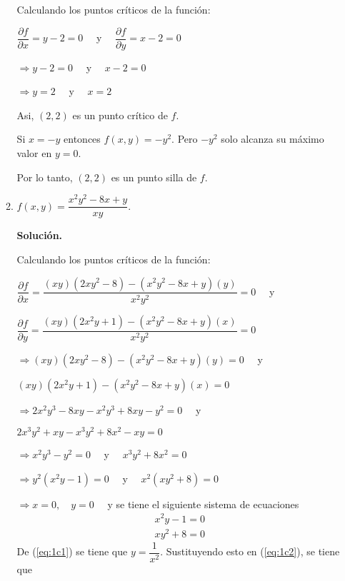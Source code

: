 \documentclass[fleqn, 12pt]{article}
\newcommand{\derivadaparcial}[2]{\dfrac{\partial {#1}}{\partial {#2}}}
\begin{document}
\begin{enumerate}
\begin{enumerate}
            Calculando los puntos críticos de la función:

            $ \derivadaparcial{f}{x} = y - 2 = 0 \quad $ y $ \quad \derivadaparcial{f}{y} = x - 2 = 0 $

            $ \Longrightarrow y - 2 = 0 \quad $ y $ \quad x - 2 = 0 $

            $ \Longrightarrow y = 2 \quad $ y $ \quad x = 2 $

            Asi, $ (2,2) $ es un punto crítico de $ f $.

            Si $ x = -y $ entonces $ f(x,y) = -y^2 $. Pero $ -y^2 $ solo alcanza su máximo valor en $ y = 0 $.

            Por lo tanto, $ (2,2) $ es un punto silla de $ f $.

            \item $ f(x,y) = \dfrac{x^2 y^2 - 8x + y}{xy} $.
            
            \textbf{Solución.}

            Calculando los puntos críticos de la función:

            $ \derivadaparcial{f}{x} = \dfrac{(xy)(2x y^2 - 8) - (x^2 y^2 - 8x + y)(y)}{x^2 y^2} = 0 \quad $ y

            $ \derivadaparcial{f}{y} = \dfrac{(xy)(2x^2 y + 1) - (x^2 y^2 - 8x + y)(x)}{x^2 y^2} = 0 $


            $ \Longrightarrow (xy)(2x y^2 - 8) - (x^2 y^2 - 8x + y)(y) = 0 \quad $ y

            \hspace{7mm} $ (xy)(2x^2 y + 1) - (x^2 y^2 - 8x + y)(x) = 0 $


            $ \Longrightarrow 2x^2 y^3 - 8xy - x^2 y^3 + 8xy - y^2 = 0 \quad $ y

            \hspace{7mm} $ 2x^3 y^2 + xy - x^3 y^2 + 8x^2 - xy = 0 $


            $ \Longrightarrow x^2 y^3 - y^2 = 0 \quad $ y $ \quad x^3 y^2 + 8x^2 = 0 $

            $ \Longrightarrow y^2(x^2 y - 1) = 0 \quad $ y $ \quad x^2(xy^2 + 8) = 0 $

            $ \Longrightarrow x = 0, \quad y = 0 \quad $ y se tiene el siguiente sistema de ecuaciones
            \begin{align}
                x^2 y - 1 = 0 \label{eq:1c1} \\
                xy^2 + 8 = 0 \label{eq:1c2}
            \end{align}
            De (\ref{eq:1c1}) se tiene que $ y = \dfrac{1}{x^2} $. Sustituyendo esto en (\ref{eq:1c2}), se tiene que


\end{enumerate}
\end{enumerate}
\end{document}
